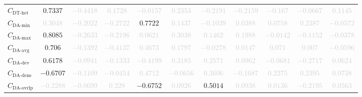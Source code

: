 \documentclass{standalone}
\newcommand{\dthetname}{\text{DT-het}}
\newcommand{\dthet}{C_{\dthetname}}
\newcommand{\daminname}{\text{DA-min}}
\newcommand{\damin}{C_{\daminname}}
\newcommand{\daavgname}{\text{DA-avg}}
\newcommand{\daavg}{C_{\daavgname}}
\newcommand{\damaxname}{\text{DA-max}}
\newcommand{\damax}{C_{\damaxname}}
\newcommand{\dadevname}{\text{DA-dev}}
\newcommand{\dadev}{C_{\dadevname}}
\newcommand{\dadensname}{\text{DA-dens}}
\newcommand{\dadens}{C_{\dadensname}}
\newcommand{\daoverlapname}{\text{DA-ovrlp}}
\newcommand{\daoverlap}{C_{\daoverlapname}}
\begin{document}
\begin{tabular}{lcccccccccc}
$\dthet$ & $0.7337$ & \textcolor{lightgray}{$-0.4418$} & \textcolor{lightgray}{$0.1728$} & \textcolor{lightgray}{$-0.0157$} & \textcolor{lightgray}{$0.2353$} & \textcolor{lightgray}{$-0.2191$} & \textcolor{lightgray}{$-0.2159$} & \textcolor{lightgray}{$-0.167$} & \textcolor{lightgray}{$-0.0667$} & \textcolor{lightgray}{$0.1145$} \\ 
$\damin$ & \textcolor{lightgray}{$0.3048$} & \textcolor{lightgray}{$-0.2022$} & \textcolor{lightgray}{$-0.2722$} & $0.7722$ & \textcolor{lightgray}{$0.1437$} & \textcolor{lightgray}{$-0.1039$} & \textcolor{lightgray}{$0.0388$} & \textcolor{lightgray}{$0.0758$} & \textcolor{lightgray}{$0.2387$} & \textcolor{lightgray}{$-0.0572$} \\ 
$\damax$ & $0.8085$ & \textcolor{lightgray}{$-0.2633$} & \textcolor{lightgray}{$-0.2196$} & \textcolor{lightgray}{$0.0621$} & \textcolor{lightgray}{$0.3038$} & \textcolor{lightgray}{$0.1462$} & \textcolor{lightgray}{$0.1988$} & \textcolor{lightgray}{$-0.0142$} & \textcolor{lightgray}{$-0.1152$} & \textcolor{lightgray}{$-0.0378$} \\ 
$\daavg$ & $0.706$ & \textcolor{lightgray}{$-0.1392$} & \textcolor{lightgray}{$-0.4137$} & \textcolor{lightgray}{$0.4673$} & \textcolor{lightgray}{$0.1797$} & \textcolor{lightgray}{$-0.0278$} & \textcolor{lightgray}{$0.0147$} & \textcolor{lightgray}{$0.071$} & \textcolor{lightgray}{$0.007$} & \textcolor{lightgray}{$-0.0596$} \\ 
$\dadev$ & $0.6178$ & \textcolor{lightgray}{$-0.0941$} & \textcolor{lightgray}{$-0.1333$} & \textcolor{lightgray}{$-0.4199$} & \textcolor{lightgray}{$0.3185$} & \textcolor{lightgray}{$0.2571$} & \textcolor{lightgray}{$0.0962$} & \textcolor{lightgray}{$-0.0681$} & \textcolor{lightgray}{$-0.2717$} & \textcolor{lightgray}{$0.0624$} \\ 
$\dadens$ & $-0.6707$ & \textcolor{lightgray}{$-0.1109$} & \textcolor{lightgray}{$-0.0454$} & \textcolor{lightgray}{$0.4712$} & \textcolor{lightgray}{$-0.0656$} & \textcolor{lightgray}{$0.3606$} & \textcolor{lightgray}{$-0.1687$} & \textcolor{lightgray}{$0.2275$} & \textcolor{lightgray}{$0.2395$} & \textcolor{lightgray}{$0.0738$} \\ 
$\daoverlap$ & \textcolor{lightgray}{$-0.2288$} & \textcolor{lightgray}{$-0.0699$} & \textcolor{lightgray}{$0.228$} & $-0.6752$ & \textcolor{lightgray}{$0.0926$} & $0.5014$ & \textcolor{lightgray}{$0.0938$} & \textcolor{lightgray}{$0.0136$} & \textcolor{lightgray}{$-0.2195$} & \textcolor{lightgray}{$0.0563$} \\ 

\end{tabular}
\end{document}

